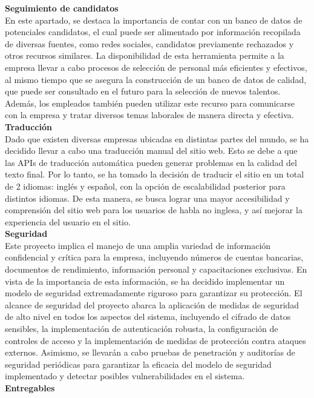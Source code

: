   \textbf{Seguimiento de candidatos}
  \\ \newline
  En este apartado, se destaca la importancia de contar con un banco de datos de potenciales candidatos, el cual puede ser alimentado por información recopilada de diversas fuentes, como redes sociales, candidatos previamente rechazados y otros recursos similares. La disponibilidad de esta herramienta permite a la empresa llevar a cabo procesos de selección de personal más eficientes y efectivos, al mismo tiempo que se asegura la construcción de un banco de datos de calidad, que puede ser consultado en el futuro para la selección de nuevos talentos. Además, los empleados también pueden utilizar este recurso para comunicarse con la empresa y tratar diversos temas laborales de manera directa y efectiva.
  \\ \newline
  \textbf{Traducción}
  \\ \newline
  Dado que existen diversas empresas ubicadas en distintas partes del mundo, se ha decidido llevar a cabo una traducción manual del sitio web. Esto se debe a que las APIs de traducción automática pueden generar problemas en la calidad del texto final. Por lo tanto, se ha tomado la decisión de traducir el sitio en un total de 2 idiomas: inglés y español, con la opción de escalabilidad posterior para distintos idiomas. De esta manera, se busca lograr una mayor accesibilidad y comprensión del sitio web para los usuarios de habla no inglesa, y así mejorar la experiencia del usuario en el sitio.
  \\ \newline
  \textbf{Seguridad}
  \\ \newline
  Este proyecto implica el manejo de una amplia variedad de información confidencial y crítica para la empresa, incluyendo números de cuentas bancarias, documentos de rendimiento, información personal y capacitaciones exclusivas. En vista de la importancia de esta información, se ha decidido implementar un modelo de seguridad extremadamente riguroso para garantizar su protección. El alcance de seguridad del proyecto abarca la aplicación de medidas de seguridad de alto nivel en todos los aspectos del sistema, incluyendo el cifrado de datos sensibles, la implementación de autenticación robusta, la configuración de controles de acceso y la implementación de medidas de protección contra ataques externos. Asimismo, se llevarán a cabo pruebas de penetración y auditorías de seguridad periódicas para garantizar la eficacia del modelo de seguridad implementado y detectar posibles vulnerabilidades en el sistema. 
  \\ \newline
    \noindent
  \textbf{Entregables}

